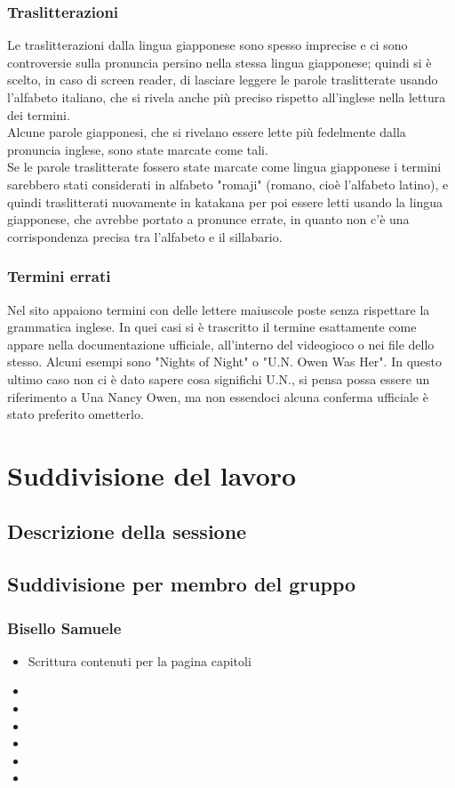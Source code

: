 \documentclass[openany, a4paper, 12pt]{report}
\begin{document}
			\subsection{Traslitterazioni}
				Le traslitterazioni dalla lingua giapponese sono spesso imprecise e ci sono controversie sulla pronuncia persino nella stessa lingua giapponese; quindi si è scelto, in caso di screen reader, di lasciare leggere le parole traslitterate usando l'alfabeto italiano, che si rivela anche più preciso rispetto all'inglese nella lettura dei termini.\\
				Alcune parole giapponesi, che si rivelano essere lette più fedelmente dalla pronuncia inglese, sono state marcate come tali.\\
				Se le parole traslitterate fossero state marcate come lingua giapponese i termini sarebbero stati considerati in alfabeto "romaji" (romano, cioè l'alfabeto latino), e quindi traslitterati nuovamente in katakana per poi essere letti usando la lingua giapponese, che avrebbe portato a pronunce errate, in quanto non c'è una corrispondenza precisa tra l'alfabeto e il sillabario.
			\subsection{Termini errati}
				Nel sito appaiono termini con delle lettere maiuscole poste senza rispettare la grammatica inglese. In quei casi si è trascritto il termine esattamente come appare nella documentazione ufficiale, all'interno del videogioco o nei file dello stesso. Alcuni esempi sono "Nights of Night" o "U.N. Owen Was Her". In questo ultimo caso non ci è dato sapere cosa significhi U.N., si pensa possa essere un riferimento a Una Nancy Owen, ma non essendoci alcuna conferma ufficiale è stato preferito ometterlo.\\

	\chapter{Suddivisione del lavoro}
	\section{Descrizione della sessione}
	\section{Suddivisione per membro del gruppo}
	\subsection{Bisello Samuele}
	\begin{itemize}
		\item Scrittura contenuti per la pagina capitoli
		\item 
		\item 
		\item 
		\item 
		\item 
		\item 
	\end{itemize}
\end{document}
